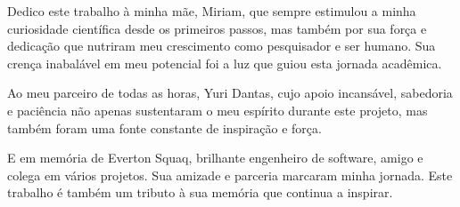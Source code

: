Dedico este trabalho à minha mãe, Miriam, que sempre estimulou a minha curiosidade científica desde os primeiros passos, mas também por sua força e dedicação que nutriram meu crescimento como pesquisador e ser humano. Sua crença inabalável em meu potencial foi a luz que guiou esta jornada acadêmica.

Ao meu parceiro de todas as horas, Yuri Dantas, cujo apoio incansável, sabedoria e paciência não apenas sustentaram o meu espírito durante este projeto, mas também foram uma fonte constante de inspiração e força.

E em memória de Everton Squaq, brilhante engenheiro de software, amigo e colega em vários projetos. Sua amizade e parceria marcaram minha jornada. Este trabalho é também um tributo à sua memória que continua a inspirar.